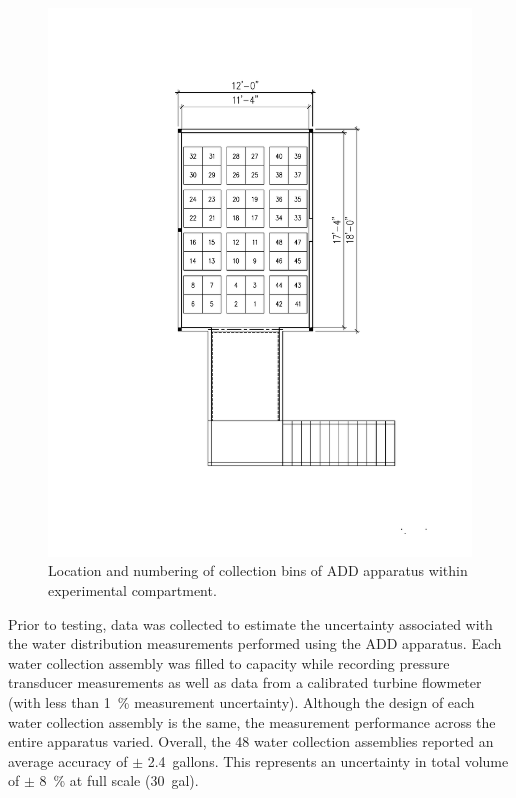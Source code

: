\documentclass[12pt,oneside]{book}
\begin{document}
\begin{figure}[!ht]
	\centering
	\includegraphics[width=\columnwidth]{Figures/Water_Distribution/ADD_Bins}
	\caption[ADD Bin Numbers and Locations]{Location and numbering of collection bins of ADD apparatus within experimental compartment.}
	\label{fig:Bin Numbers and Locations}
\end{figure}

Prior to testing, data was collected to estimate the uncertainty associated with the water distribution measurements performed using the ADD apparatus. Each water collection assembly was filled to capacity while recording pressure transducer measurements as well as data from a calibrated turbine flowmeter (with less than 1~\% measurement uncertainty). Although the design of each water collection assembly is the same, the measurement performance across the entire apparatus varied. Overall, the 48 water collection assemblies reported an average accuracy of $\pm$ 2.4~gallons. This represents an uncertainty in total volume of $\pm$ 8~\% at full scale (30~gal).
\end{document}
